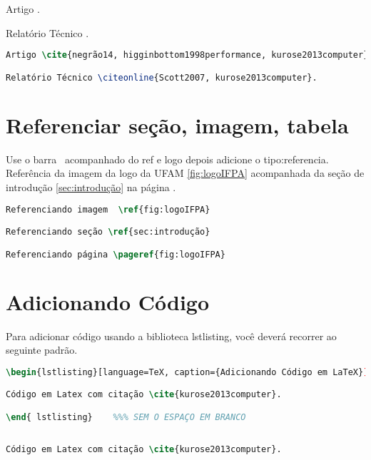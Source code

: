     Artigo \cite{negrão14, higginbottom1998performance, kurose2013computer}.
    
    Relatório Técnico .

\begin{lstlisting}[language=TeX, caption={citação4}]
Artigo \cite{negrão14, higginbottom1998performance, kurose2013computer}.

Relatório Técnico \citeonline{Scott2007, kurose2013computer}.
\end{lstlisting}

\section{Referenciar seção, imagem, tabela}

    Use o barra \ acompanhado do ref e logo depois adicione o tipo:referencia. Referência da imagem da logo da UFAM \ref{fig:logoIFPA} acompanhada da seção de introdução \ref{sec:introdução} na página \pageref{fig:logoIFPA}.

\begin{lstlisting}[language=TeX, caption={Refenciando Elementos}]
Referenciando imagem  \ref{fig:logoIFPA}

Referenciando seção \ref{sec:introdução}

Referenciando página \pageref{fig:logoIFPA}
\end{lstlisting}

\section{Adicionando Código}

Para adicionar código usando a biblioteca lstlisting, você deverá recorrer ao seguinte padrão.

\begin{lstlisting}[language=TeX, caption={Adicionando Código em LaTeX}]
\begin{lstlisting}[language=TeX, caption={Adicionando Código em LaTeX}]

Código em Latex com citação \cite{kurose2013computer}.

\end{ lstlisting}    %%% SEM O ESPAÇO EM BRANCO
\end{lstlisting}

\begin{lstlisting}[language=TeX, caption={Adicionando Código - Como aparecerá}]

Código em Latex com citação \cite{kurose2013computer}.

\end{lstlisting}

